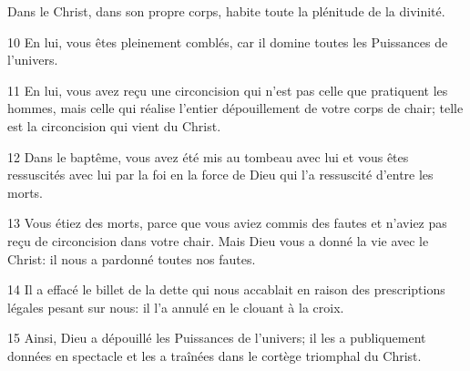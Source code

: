 Dans le Christ, dans son propre corps, habite toute la plénitude de la divinité. 

10 En lui, vous êtes pleinement comblés, car il domine toutes les Puissances de l’univers.

11 En lui, vous avez reçu une circoncision qui n’est pas celle que pratiquent les hommes, mais celle qui réalise l’entier dépouillement de votre corps de chair; telle est la circoncision qui vient du Christ.

12 Dans le baptême, vous avez été mis au tombeau avec lui et vous êtes ressuscités avec lui par la foi en la force de Dieu qui l’a ressuscité d’entre les morts.

13 Vous étiez des morts, parce que vous aviez commis des fautes et n’aviez pas reçu de circoncision dans votre chair. Mais Dieu vous a donné la vie avec le Christ: il nous a pardonné toutes nos fautes.

14 Il a effacé le billet de la dette qui nous accablait en raison des prescriptions légales pesant sur nous: il l’a annulé en le clouant à la croix.

15 Ainsi, Dieu a dépouillé les Puissances de l’univers; il les a publiquement données en spectacle et les a traînées dans le cortège triomphal du Christ.